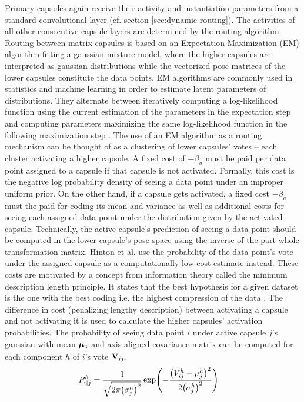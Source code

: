 Primary capsules again receive their activity and instantiation parameters from a standard convolutional layer (cf. section \ref{sec:dynamic-routing}). The activities of all other consecutive capsule layers are determined by the routing algorithm. Routing between matrix-capsules is based on an Expectation-Maximization (EM) algorithm fitting a gaussian mixture model, where the higher capsules are interpreted as gaussian distributions while the vectorized pose matrices of the lower capsules constitute the data points. EM algorithms are commonly used in statistics and machine learning in order to estimate latent parameters of distributions. They alternate between iteratively computing a log-likelihood function using the current estimation of the parameters in the expectation step and computing parameters maximizing the same log-likelihood function in the following maximization step \cite{dempster1977maximum}. The use of an EM algorithm as a routing mechanism can be thought of as a clustering of lower capsules' votes -- each cluster activating a higher capsule. A fixed cost of $-\beta_u$ must be paid per data point assigned to a capsule if that capsule is not activated. Formally, this cost is the negative log probability density of seeing a data point under an improper uniform prior. On the other hand, if a capsule gets activated, a fixed cost $-\beta_a$ must the paid for coding its mean and variance as well as additional costs for seeing each assigned data point under the distribution given by the activated capsule. Technically, the active capsule's prediction of seeing a data point should be computed in the lower capsule's pose space using the inverse of the part-whole transformation matrix. Hinton et al. use the probability of the data point's vote under the assigned capsule as a computationally low-cost estimate instead. These costs are motivated by a concept from information theory called the minimum description length principle. It states that the best hypothesis for a given dataset is the one with the best coding i.e. the highest compression of the data \cite{rissanen1978modeling}. The difference in cost (penalizing lengthy description) between activating a capsule and not activating it is used to calculate the higher capsules' activation probabilities.\newpage\noindent
The probability of seeing data point $i$ under active capsule $j$'s gaussian with mean $\vb*{\mu}_j$ and axis aligned covariance matrix can be computed for each component $h$ of $i$'s vote $\vb{V}_{ij}$.
\begin{align}
    P_{i|j}^h &= \frac{1}{\sqrt{2\pi\qty(\sigma_j^h)^2}}\exp(-\frac{\qty(V_{ij}^h-\mu_j^h)^2}{2\qty(\sigma_j^h)^2})
\end{align}

